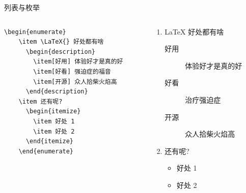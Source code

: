   \begin{frame}[fragile]{列表与枚举}
    \begin{columns}
    \begin{column}{.6\textwidth}
    \begin{lstlisting}[basicstyle=\ttfamily\small]
    \begin{enumerate}
    \item \LaTeX{} 好处都有啥
      \begin{description}
        \item[好用] 体验好才是真的好
        \item[好看] 强迫症的福音
        \item[开源] 众人拾柴火焰高
      \end{description}
    \item 还有呢?
      \begin{itemize}
        \item 好处 1
        \item 好处 2
      \end{itemize}
    \end{enumerate}
    \end{lstlisting}
    \end{column}
    \begin{column}{.4\textwidth}
    {\small
    \begin{enumerate}
    \item \LaTeX{} 好处都有啥
      \begin{description}
        \item[好用] 体验好才是真的好
        \item[好看] 治疗强迫症
        \item[开源] 众人拾柴火焰高
      \end{description}
    \item 还有呢?
      \begin{itemize}
        \item 好处 1
        \item 好处 2
      \end{itemize}
    \end{enumerate}
    }
    \end{column}
    \end{columns}
    
    \end{frame}
    


